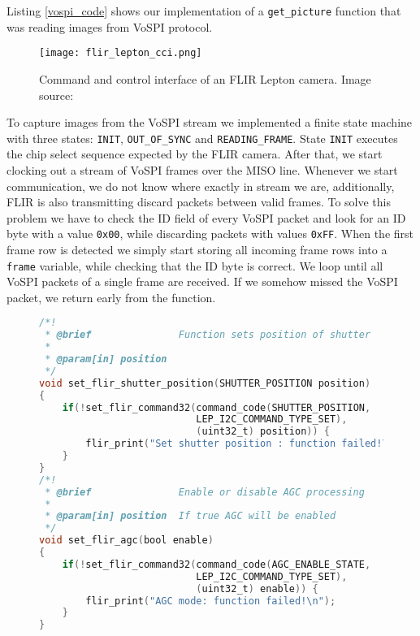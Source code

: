 Listing \ref{vospi_code} shows our implementation of a \verb|get_picture| function that was reading images from VoSPI protocol.
\newline
\begin{figure}[ht]
        \centering
        \texttt{[image: flir\_lepton\_cci.png]} 
        \caption[Command and control interface of an FLIR Lepton camera.]{Command and control interface of an FLIR Lepton camera. Image source: \cite{flir_datasheet}} 
        \label{flir_lepton_cci}
\end{figure}
\clearpage
To capture images from the VoSPI stream we implemented a finite state machine with three states: \verb|INIT|, \verb|OUT_OF_SYNC| and \verb|READING_FRAME|.
State \verb|INIT| executes the chip select sequence expected by the FLIR camera.
After that, we start clocking out a stream of VoSPI frames over the MISO line.
Whenever we start communication, we do not know where exactly in stream we are, additionally, FLIR is also transmitting discard packets between valid frames.
To solve this problem we have to check the ID field of every VoSPI packet and look for an ID byte with a value \verb|0x00|, while discarding packets with values \verb|0xFF|.
When the first frame row is detected we simply start storing all incoming frame rows into a \verb|frame| variable, while checking that the ID byte is correct.
We loop until all VoSPI packets of a single frame are received.
If we somehow missed the VoSPI packet, we return early from the function.
\newline
\lstset{style=mystyle}
\begin{figure}[ht]
\begin{lstlisting}[language=C]
/*!
 * @brief               Function sets position of shutter
 *
 * @param[in] position  
 */
void set_flir_shutter_position(SHUTTER_POSITION position)
{ 
    if(!set_flir_command32(command_code(SHUTTER_POSITION, 
                           LEP_I2C_COMMAND_TYPE_SET), 
                           (uint32_t) position)) {
        flir_print("Set shutter position : function failed!\n");
    }
}
/*!
 * @brief               Enable or disable AGC processing
 *
 * @param[in] position  If true AGC will be enabled
 */
void set_flir_agc(bool enable)
{
    if(!set_flir_command32(command_code(AGC_ENABLE_STATE, 
                           LEP_I2C_COMMAND_TYPE_SET), 
                           (uint32_t) enable)) {
        flir_print("AGC mode: function failed!\n");
    }
}
\end{lstlisting}
\label{flir_api}
\end{figure}

